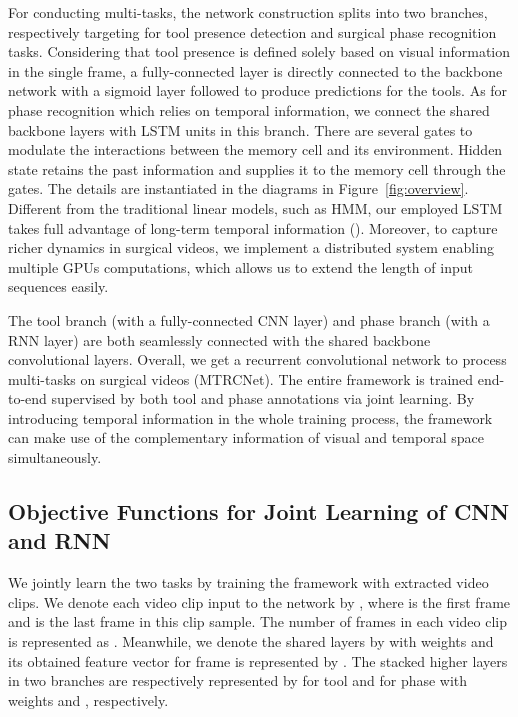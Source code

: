 \documentclass{elsarticle}
\begin{document}
For conducting multi-tasks, the network construction splits into two branches, respectively targeting for tool presence detection and surgical phase recognition tasks.
Considering that tool presence is defined solely based on visual information in the single frame, a fully-connected layer is directly connected to the backbone network with a sigmoid layer followed to produce predictions for the tools.
As for phase recognition which relies on temporal information, we connect the shared backbone layers with LSTM units in this branch.
There are several gates to modulate the interactions between the memory cell  and its environment.
Hidden state  retains the past information and supplies it to the memory cell through the gates.
The details are instantiated in the diagrams in Figure~\ref{fig:overview}. 
Different from the traditional linear models, such as HMM, our employed LSTM takes full advantage of long-term temporal information (\cite{donahue2015long}).
Moreover, to capture richer dynamics in surgical videos, we implement a distributed system enabling multiple GPUs computations, which allows us to extend the length of input sequences easily.

The tool branch (with a fully-connected CNN layer) and phase branch (with a RNN layer) are both seamlessly connected with the shared backbone convolutional layers.
Overall, we get a recurrent convolutional network to process multi-tasks on surgical videos (MTRCNet).
The entire framework is trained end-to-end supervised by both tool and phase annotations via joint learning.
By introducing temporal information in the whole training process, the framework can make use of the complementary information of visual and temporal space simultaneously.



\subsection{Objective Functions for Joint Learning of CNN and RNN}
We jointly learn the two tasks by training the framework with extracted video clips.
We denote each video clip input to the network by , where  is the first frame and  is the last frame in this clip sample. 
The number of frames in each video clip is represented as . 
Meanwhile, we denote the shared layers by  with weights  and its obtained feature vector for frame  is represented by .
The stacked higher layers in two branches are respectively represented by  for tool and  for phase with weights  and , respectively.
\end{document}
